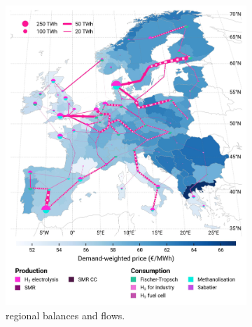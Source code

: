 \documentclass[final,5p,times,twocolumn,sort&compress]{elsarticle}
\begin{document}
\begin{figure}[htbp]
  \centering
  \begin{subfigure}[t]{0.49\textwidth}
      \vspace{0pt}
      \includegraphics[width=1\textwidth]{maps/pcipmi-national-international-expansion/base_s_adm___2050-balance_map_H2}
      \vspace{-0.5cm}
      \caption{ regional balances and flows.}
      \label{fig:PCI-in_lt_2050_h2}
  \end{subfigure}
  \hfill
  \begin{subfigure}[t]{0.49\textwidth}
      \vspace{0pt}

\end{subfigure}
\end{figure}
\end{document}
